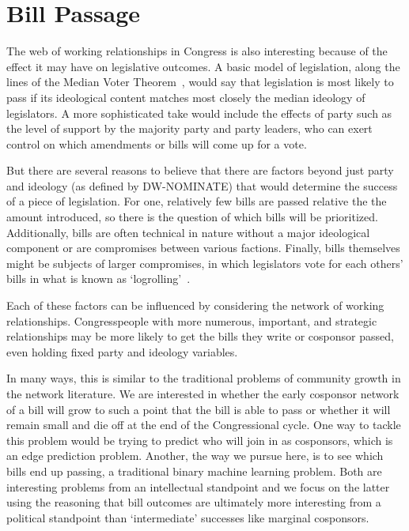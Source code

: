 \section{Bill Passage}

The web of working relationships in Congress is also interesting because of the effect it may have on legislative outcomes. A basic model of legislation, along the lines of the Median Voter Theorem~\cite{Black}, would say that legislation is most likely to pass if its ideological content matches most closely the median ideology of legislators. A more sophisticated take would include the effects of party such as the level of support by the majority party and party leaders, who can exert control on which amendments or bills will come up for a vote.

But there are several reasons to believe that there are factors beyond just party and ideology (as defined by DW-NOMINATE) that would determine the success of a piece of legislation. For one, relatively few bills are passed relative the the amount introduced, so there is the question of which bills will be prioritized. Additionally, bills are often technical in nature without a major ideological component or are compromises between various factions. Finally, bills themselves might be subjects of larger compromises, in which legislators vote for each others' bills in what is known as `logrolling'~\cite{Schwartz}. 

Each of these factors can be influenced by considering the network of working relationships. Congresspeople with more numerous, important, and strategic relationships may be more likely to get the bills they write or cosponsor passed, even holding fixed party and ideology variables.

In many ways, this is similar to the traditional problems of community growth in the network literature. We are interested in whether the early cosponsor network of a bill will grow to such a point that the bill is able to pass or whether it will remain small and die off at the end of the Congressional cycle. One way to tackle this problem would be trying to predict who will join in as cosponsors, which is an edge prediction problem. Another, the way we pursue here, is to see which bills end up passing, a traditional binary machine learning problem. Both are interesting problems from an intellectual standpoint and we focus on the latter using the reasoning that bill outcomes are ultimately more interesting from a political standpoint than `intermediate' successes like marginal cosponsors.

